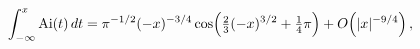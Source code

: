 \[\int_{-\infty}^{x}\mathop{\mathrm{Ai}\/}\nolimits\!\left(t\right)dt=\pi^{-1/2}%
(-x)^{-3/4}\*\mathop{\cos\/}\nolimits\!\left(\tfrac{2}{3}(-x)^{3/2}+\tfrac{1}{%
4}\pi\right)+\mathop{O\/}\nolimits\!\left(|x|^{-9/4}\right),\]